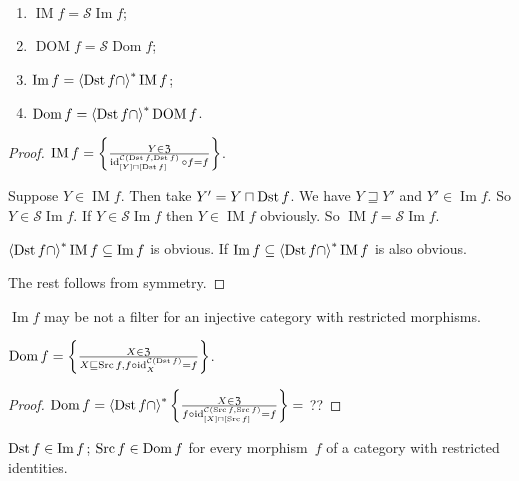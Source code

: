 \begin{prop}
~
\begin{enumerate}
\item $\operatorname{IM} f = \mathscr{S}\operatorname{Im} f$;
\item $\operatorname{DOM} f = \mathscr{S}\operatorname{Dom} f$;
\item $\operatorname{Im} f = \left\langle \operatorname{Dst} f\cap\right\rangle ^{\ast}\operatorname{IM} f$;
\item $\operatorname{Dom} f = \left\langle \operatorname{Dst} f\cap\right\rangle ^{\ast}\operatorname{DOM} f$.
\end{enumerate}
\end{prop}

\begin{proof}
$\operatorname{IM} f =
\left\{ \frac{Y \in \mathfrak{Z}}{\operatorname{id}^{\mathcal{C}(\operatorname{Dst} f,\operatorname{Dst} f)}_{[Y]\sqcap[\operatorname{Dst} f]} \circ f = f}\right\}$.

Suppose $Y\in\operatorname{IM}f$. Then take $Y'=Y\sqcap\operatorname{Dst} f$. We have $Y\sqsupseteq Y'$ and $Y'\in\operatorname{Im}f$. So $Y\in\mathscr{S}\operatorname{Im}f$. If $Y\in\mathscr{S}\operatorname{Im}f$ then $Y\in\operatorname{IM}f$ obviously.
So $\operatorname{IM} f = \mathscr{S}\operatorname{Im} f$.

$\left\langle \operatorname{Dst} f\cap\right\rangle ^{\ast}\operatorname{IM}f\subseteq
\operatorname{Im}f$ is obvious. If
$\operatorname{Im}f\subseteq\left\langle \operatorname{Dst} f\cap\right\rangle ^{\ast}\operatorname{IM}f$ is also obvious.

The rest follows from symmetry.
\end{proof}

\begin{conjecture}
$\operatorname{Im} f$ may be not a filter for an injective
category with restricted morphisms.
\end{conjecture}

\begin{prop}
$\operatorname{Dom}f =
\left\{ \frac{X\in\mathfrak{Z}}{X\sqsubseteq\operatorname{Src} f,
f\circ\operatorname{id}^{\mathcal{C}(\operatorname{Dst} f)}_X=f}\right\}$.
\end{prop}

\begin{proof}
$\operatorname{Dom}f =
\left\langle \operatorname{Dst} f\cap\right\rangle ^{\ast}
\left\{ \frac{X \in \mathfrak{Z}}{f \circ \operatorname{id}^{\mathcal{C}(\operatorname{Src} f,\operatorname{Src} f)}_{[X]\sqcap[\operatorname{Src} f]} = f}\right\}=$
??
\end{proof}

\begin{prop}\label{dst-in-im}
$\operatorname{Dst} f\in\operatorname{Im} f$; $\operatorname{Src} f\in\operatorname{Dom} f$ for every morphism~$f$ of a category with restricted
identities.
\end{prop}

